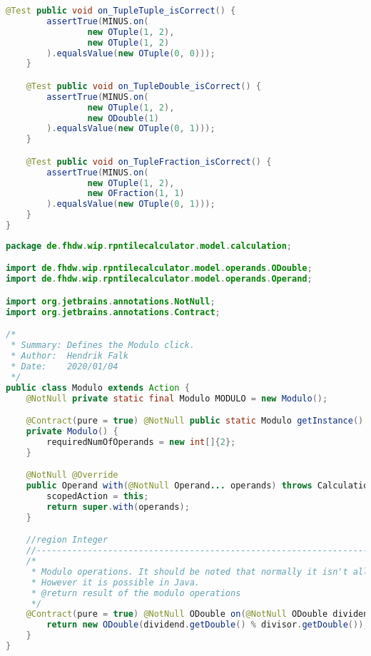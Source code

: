 \begin{lstlisting}[caption=MinusTest (Falk),label=list:MinusTest,language=Java]
    @Test public void on_TupleTuple_isCorrect() {
        assertTrue(MINUS.on(
                new OTuple(1, 2),
                new OTuple(1, 2)
        ).equalsValue(new OTuple(0, 0)));
    }

    @Test public void on_TupleDouble_isCorrect() {
        assertTrue(MINUS.on(
                new OTuple(1, 2),
                new ODouble(1)
        ).equalsValue(new OTuple(0, 1)));
    }

    @Test public void on_TupleFraction_isCorrect() {
        assertTrue(MINUS.on(
                new OTuple(1, 2),
                new OFraction(1, 1)
        ).equalsValue(new OTuple(0, 1)));
    }
}\end{lstlisting} 

\begin{lstlisting}[caption=Modulo (Falk),label=list:Modulo,language=Java]
package de.fhdw.wip.rpntilecalculator.model.calculation;

import de.fhdw.wip.rpntilecalculator.model.operands.ODouble;
import de.fhdw.wip.rpntilecalculator.model.operands.Operand;

import org.jetbrains.annotations.NotNull;
import org.jetbrains.annotations.Contract;

/*
 * Summary: Defines the Modulo click.
 * Author:  Hendrik Falk
 * Date:    2020/01/04
 */
public class Modulo extends Action {
    @NotNull private static final Modulo MODULO = new Modulo();

    @Contract(pure = true) @NotNull public static Modulo getInstance() { return MODULO; }
    private Modulo() {
        requiredNumOfOperands = new int[]{2};
    }

    @NotNull @Override
    public Operand with(@NotNull Operand... operands) throws CalculationException {
        scopedAction = this;
        return super.with(operands);
    }

    //region Integer
    //------------------------------------------------------------------------------------
    /*
     * Modulo operations. It should be noted that normally it isn't allow to modulo with floating numbers.
     * However it is possible in Java.
     * @return result of the modulo operations
     */
    @Contract(pure = true) @NotNull ODouble on(@NotNull ODouble dividend, @NotNull ODouble divisor) {
        return new ODouble(dividend.getDouble() % divisor.getDouble());
    }
}
\end{lstlisting}    

